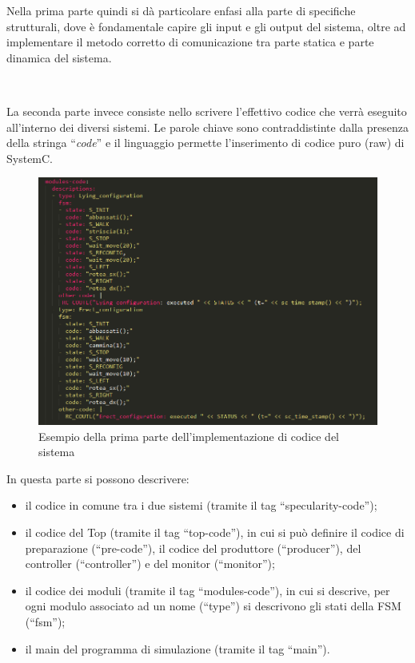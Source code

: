 \documentclass[a4paper,titlepage]{book}
\begin{document}
Nella prima parte quindi si dà particolare enfasi alla parte di specifiche strutturali, dove è fondamentale capire gli input e gli output del sistema, oltre ad implementare il metodo corretto di comunicazione tra parte statica e parte dinamica del sistema.

~ 

La seconda parte invece consiste nello scrivere l'effettivo codice che verrà eseguito all'interno dei diversi sistemi. Le parole chiave sono contraddistinte dalla presenza della stringa ``\textit{code}'' e il linguaggio permette l'inserimento di codice puro (raw) di SystemC.

\begin{figure}[!ht]
\centering
\includegraphics[scale=0.6]{pyngu_code_example.png}
\caption{Esempio della prima parte dell'implementazione di codice del sistema}\label{fig:11}
\end{figure}

In questa parte si possono descrivere:

\begin{itemize}

\item il codice in comune tra i due sistemi (tramite il tag ``specularity-code'');

\item il codice del Top (tramite il tag ``top-code''), in cui si può definire il codice di preparazione (``pre-code''), il codice del produttore (``producer''),  del controller (``controller'') e del monitor (``monitor'');

\item il codice dei moduli (tramite il tag ``modules-code''), in cui si descrive, per ogni modulo associato ad un nome (``type'') si descrivono gli stati della FSM (``fsm'');

\item il main del programma di simulazione (tramite il tag ``main''). 

\end{itemize}
\end{document}
